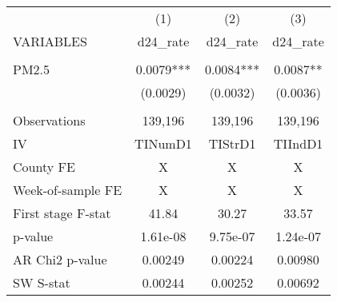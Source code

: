 \begin{tabular}{lccc} \hline
 & (1) & (2) & (3) \\
VARIABLES & d24\_rate & d24\_rate & d24\_rate \\ \hline
 &  &  &  \\
PM2.5 & 0.0079*** & 0.0084*** & 0.0087** \\
 & (0.0029) & (0.0032) & (0.0036) \\
 &  &  &  \\
Observations & 139,196 & 139,196 & 139,196 \\
IV & TINumD1 & TIStrD1 & TIIndD1 \\
County FE & X & X & X \\
Week-of-sample FE & X & X & X \\
First stage F-stat & 41.84 & 30.27 & 33.57 \\
p-value & 1.61e-08 & 9.75e-07 & 1.24e-07 \\
AR Chi2 p-value & 0.00249 & 0.00224 & 0.00980 \\
 SW S-stat & 0.00244 & 0.00252 & 0.00692 \\ \hline
\end{tabular}
